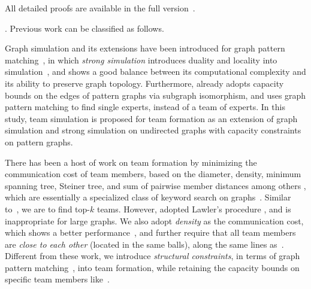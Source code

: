 All detailed proofs are available  in the full version~\cite{fullvldb18}.

. Previous work can be classified as follows.


 Graph simulation \cite{infsimu95} and its extensions have been introduced for graph pattern matching~\cite{FanLMTWW10,MaCFHW14,Guanfeng15,FanCount16}, in which {\em strong simulation} introduces duality and locality into simulation~\cite{MaCFHW14}, and shows a good balance between its computational complexity and its ability to preserve graph topology. Furthermore, \cite{FanCount16} already adopts capacity bounds on the edges of pattern graphs via subgraph isomorphism, and \cite{FanWWXin13} uses graph pattern matching to find single experts, instead of a team of experts. In this study, team simulation is proposed for team formation as an extension of graph simulation and strong simulation on undirected graphs with capacity constraints on pattern graphs.



There has been a host of work on team formation by minimizing the communication cost of team members, based on the diameter, density, minimum spanning tree, Steiner tree, and sum of pairwise member distances among others \cite{Lappas09,Kargar11,ArisLuca12,GajewarS12,realTeamForm13,SamikKVM12,LiTongCao15}, which are essentially  a specialized class of keyword search on graphs~\cite{Aggarwal10}. Similar to~\cite{Kargar11}, we are to find top-$k$ teams. However, \cite{Kargar11} adopted Lawler's procedure \cite{Lawler1972}, and is inappropriate for large graphs. We also adopt {\em density}  as the communication cost, which shows a better performance~\cite{GajewarS12}, and further require that all team members are {\em close to each other} (located in the same balls), along the same lines as~\cite{Lappas09,Kargar11,ArisLuca12,SamikKVM12}. 
Different from these work, we introduce {\em structural constraints}, in terms of graph pattern matching~\cite{FanLMTWW10,MaCFHW14}, into team formation, while retaining the capacity bounds on specific team members like~\cite{realTeamForm13,GajewarS12}.




